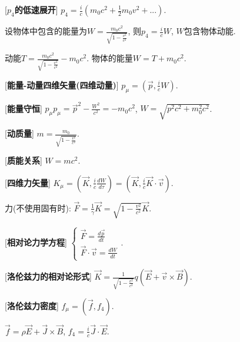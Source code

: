 [\textbf{$p_4$的低速展开}] $p_4=\frac{i}{c}(m_0c^2+\frac{1}{2}m_0v^2+...)$.\par
\qquad 设物体中包含的能量为$W=\frac{m_0c^2}{\sqrt{1-\frac{v^2}{c^2}}}$, 则$p_4=\frac{i}{c}W$, $W$包含物体动能. \par
动能$T=\frac{m_0c^2}{\sqrt{1-\frac{v^2}{c^2}}}-m_0c^2$. 物体的能量$W=T+m_0c^2$.\par

[\textbf{能量-动量四维矢量(四维动量)}] $p_\mu=(\vec p,\frac{i}{c}W)$.\par

[\textbf{能量守恒}] $p_\mu p_\mu=\vec p^2-\frac{W^2}{c^2}=-m_0c^2$, $W=\sqrt{p^2c^2+m_0^2c^2}$.\par

[\textbf{动质量}] $m=\frac{m_0}{\sqrt{1-\frac{v^2}{c^2}}}$.\par

[\textbf{质能关系}] $W=mc^2$.\par

[\textbf{四维力矢量}] $K_\mu=(\vec K, \frac{i}{c}\frac{dW}{d\tau})=(\vec K,\frac{i}{c}\vec K\cdot\vec v)$.\par
\qquad 力(不使用固有时): $\vec F=\frac{1}{\gamma}\vec K=\sqrt{1-\frac{v^2}{c^2}}\vec K$.\par

[\textbf{相对论力学方程}] $\begin{cases}\vec F=\frac{d\vec p}{dt}\\\vec F\cdot\vec v=\frac{dW}{dt}\end{cases}$.\par

[\textbf{洛伦兹力的相对论形式}] $\vec K=\frac{1}{\sqrt{1-\frac{v^2}{c^2}}}q(\vec E+\vec v\times\vec B)$.\par

[\textbf{洛伦兹力密度}] $f_\mu=(\vec f,f_4)$.\par
\qquad $\vec f=\rho\vec E+\vec J\times\vec B$, $f_4=\frac{i}{c}\vec J\cdot\vec E$.\par


